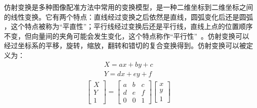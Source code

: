 仿射变换是多种图像配准方法中常用的变换模型，是一种二维坐标到二维坐标之间的线性变换。它有两个特点：直线经过变换之后依然是直线，圆弧变化后还是圆弧 ，这个特点被称为“平直性”；平行线经过变换后还是平行线，直线上点的位置顺序不变，但向量间的夹角可能会发生变化，这个特点称作“平行性”~\cite{liuwei}。仿射变换可以经过坐标系的平移，旋转，缩放，翻转和错切的复合变换得到。仿射变换可以被定义为：
\begin{equation}
\begin{split}		
X=ax+by+c\\
Y=dx+ey+f		
\end{split}
\end{equation}		
 \begin{align}
\left[ \begin{array}{c}
X \\
Y \\
1   
\end{array} \right]
=
\left[ \begin{array}{ccc}
a & b & c \\
d & e & f \\
0 & 0 & 1
\end{array} \right]
\left[ \begin{array}{c}
x \\
y\\
1
\end{array} \right]
\end{align}


